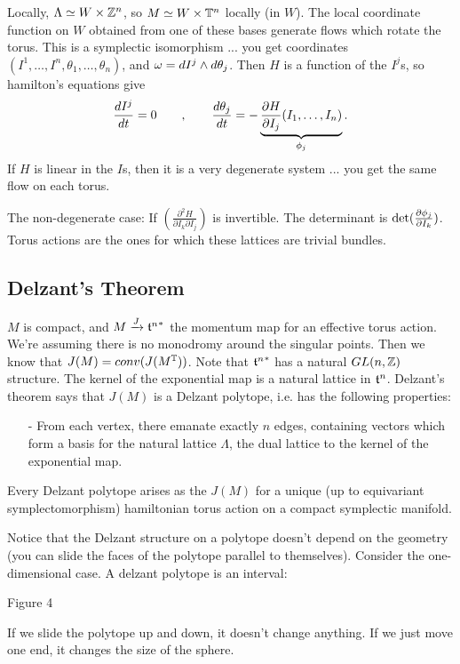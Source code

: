 Locally, $\Lambda \simeq W\times \mathbb{Z}^n$, so $M\simeq W\times \mathbb{T}^n$ locally (in $W$).
The local coordinate function on $W$ obtained from one of these bases generate flows
which rotate the torus.  This is a symplectic isomorphism ... you get coordinates
$(I^1,\dots, I^n, \theta_1,\dots, \theta_n)$, and $\omega=dI^j\wedge d\theta_j$.  Then $H$
is a function of the $I^j$s, so hamilton's equations give
\[
    \frac{d I^j}{d t}= 0 \qquad, \qquad \frac{d \theta_j}{d t} = -\underbrace{\frac{\partial H}{\partial I_j}(I_1,\dots, I_n)}_{\phi_j}.
\]
 If $H$ is linear in the $I$s, then it is a very degenerate system ... you get the
 same flow on each torus.

 The non-degenerate case: If $\left(\frac{\partial^2 H}{\partial I_k \partial I_j}\right)$ is
 invertible.  The determinant is $\det(\frac{\partial \phi_j}{\partial I_k})$.  Torus actions are the
 ones for which these lattices are trivial bundles.

 \subsection*{Delzant's Theorem}  $M$ is compact, and $M\xrightarrow{J} {\mathfrak{t}^n}^*$ the
 momentum map for an effective torus action.  We're assuming there is no monodromy around the
 singular points.  Then we know that $J(M)=conv(J(M^{\mathbb{T}}))$.  Note that ${\mathfrak{t}^n}^*$
 has a natural $GL(n,\mathbb{Z})$ structure.  The kernel of the exponential map is a natural
 lattice in $\mathfrak{t}^n$.  Delzant's theorem says that $J(M)$ is a Delzant polytope, i.e.
 has the following properties:
 \begin{itemize}
   \item[-] From each vertex, there emanate exactly $n$ edges, containing vectors
   which form a basis for the natural lattice $\Lambda$, the dual lattice to the
   kernel of the exponential map.
 \end{itemize}
 \begin{theorem}
   Every Delzant polytope arises as the $J(M)$ for a unique (up to equivariant
   symplectomorphism) hamiltonian torus action on a compact symplectic manifold.
 \end{theorem}
 Notice that the Delzant structure on a polytope doesn't depend on the geometry (you
 can slide the faces of the polytope parallel to themselves).  Consider the
 one-dimensional case.  A delzant polytope is an interval:

 Figure 4

 If we slide the polytope up and down, it doesn't change anything.  If we just move
 one end, it changes the size of the sphere.


